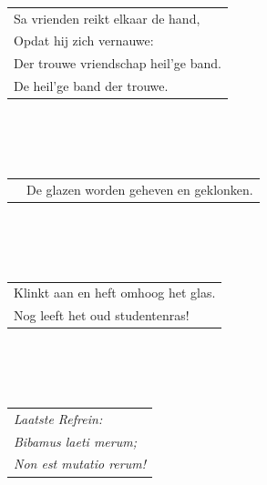 \documentclass{article}
\begin{document}
\\\\\\
\begin{tabularx}{0.7\textwidth} {
   >{\raggedright\arraybackslash}X }
Sa vrienden reikt elkaar de hand,\\
Opdat hij zich vernauwe:\\
Der trouwe vriendschap heil’ge band.\\
De heil’ge band der trouwe.\\
\end{tabularx}
\\\\\\
\begin{tabularx}{\textwidth} {
   c >{\raggedright\arraybackslash}X}
    \hspace{5mm} & {\small De glazen worden geheven en geklonken.}\\
\end{tabularx}
\\\\\\
\begin{tabularx}{0.7\textwidth} {
   >{\raggedright\arraybackslash}X }
Klinkt aan en heft omhoog het glas. \\
Nog leeft het oud studentenras!\\
\end{tabularx}
\\\\\\
\begin{tabularx}{0.7\textwidth} {
   >{\raggedright\arraybackslash}X }
\textit{Laatste Refrein:}\\
\textit{Bibamus laeti merum;} \\
\textit{Non est mutatio rerum!} \\
\end{tabularx}
\end{document}
